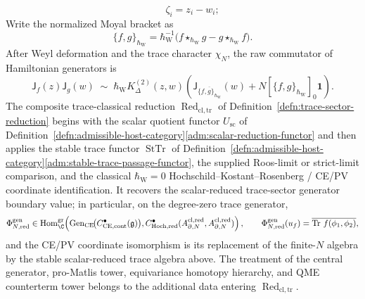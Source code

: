 \documentclass[11pt]{memoir}
\begin{document}
\begin{thm}
\begin{equation}
    \qquad\zeta_i=z_i-w_i;
  \end{equation}
  Write the normalized Moyal bracket as
  \[
    \{f,g\}_{\hbar_{\mathrm W}}
    =\hbar_{\mathrm W}^{-1}
      \bigl(f\star_{\hbar_{\mathrm W}}g
            -g\star_{\hbar_{\mathrm W}}f\bigr).
  \]
  After Weyl deformation and the trace character \(\chi_N\), the raw
  commutator of Hamiltonian generators is
  \begin{equation}\label{eq:singular-product-projective}
    \mathsf J_f(z)\mathsf J_g(w)\;\sim\;
    \hbar_{\mathrm W}K^{(2)}_\Delta(z,w)
    \left(
      \mathsf J_{\overline{\{f,g\}_{\hbar_{\mathrm W}}}}(w)
      +N[\{f,g\}_{\hbar_{\mathrm W}}]_0\mathbf1
    \right).
  \end{equation}
  The composite trace-classical reduction
  \(\operatorname{Red}_{\mathrm{cl,tr}}\) of
  Definition~\ref{defn:trace-sector-reduction} begins with the scalar
  quotient functor \(U_{\mathrm{sc}}\) of
  Definition~\ref{defn:admissible-host-category}\ref{adm:scalar-reduction-functor}
  and then applies the stable trace functor \(\operatorname{StTr}\) of
  Definition~\ref{defn:admissible-host-category}\ref{adm:stable-trace-passage-functor},
  the supplied Roos-limit or strict-limit comparison, and the
  classical \(\hbar_{\mathrm{W}}=0\) Hochschild--Kostant--Rosenberg / CE/PV coordinate identification.
  It recovers the scalar-reduced trace-sector generator boundary value;
  in particular, on the degree-zero trace generator,
  \[
    \Phi_{N,\mathrm{red}}^{\mathrm{gen}}
    \in
    \operatorname{Hom}^{\mathrm{gr}}_\C\!\left(
      \operatorname{Gen}_{\mathrm{CE}}\!
        \bigl(C^\bullet_{\mathrm{CE},\mathrm{cont}}(\mathfrak g)\bigr),
      C^\bullet_{\mathrm{Hoch,red}}(A^{\mathrm{cl,red}}_{\partial,N},
      A^{\mathrm{cl,red}}_{\partial,N})
    \right),
    \qquad
    \Phi_{N,\mathrm{red}}^{\mathrm{gen}}(u_f)=
    \overline{\operatorname{Tr}\,f(\phi_1,\phi_2)} ,
  \]
  and the CE/PV coordinate isomorphism is its replacement of the
  finite-\(N\) algebra by the stable scalar-reduced trace algebra above.
  The treatment of the central generator, pro-Matlis tower,
  equivariance homotopy hierarchy, and QME counterterm tower belongs to
  the additional data entering \(\operatorname{Red}_{\mathrm{cl,tr}}\).
\end{thm}
\end{document}
